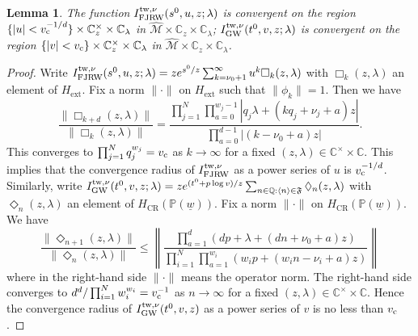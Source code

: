 \documentclass[11pt]{amsart}
\newtheorem{lem}[thm]{Lemma} %
\theoremstyle{definition} %
\theoremstyle{remark} %
\newcommand{\CC}{\mathbb C}
\newcommand{\PP}{\mathbb P}
\newcommand{\QQ}{\mathbb Q}
\newcommand{\tw}{{\rm tw}}
\def\GW{\operatorname{\text{GW}}}
\def\CR{\operatorname{\text{CR}}}
\def\fracp#1{\left\langle #1 \right\rangle}
\newcommand{\cM}{\mathcal{M}}
\newcommand{\hcM}{\widehat{\cM}}
\newcommand{\frF}{\mathfrak{F}}
\newcommand{\ext}{{\operatorname{ext}}}
\newcommand{\FJRW}{{\operatorname{FJRW}}}
\renewcommand{\GW}{{\operatorname{GW}}}
\renewcommand{\CR}{{\operatorname{CR}}}
\newcommand{\vc}{v_{\rm c}}
\newcommand{\uw}{\underline{w}}
\begin{document}
\begin{lem} 
\label{lem:convergence}
The function $I^{\tw,\nu}_{\FJRW}(s^0,u,z;\lambda)$ is convergent 
on the region $\{|u| < \vc^{-1/d}\} \times
\CC_z^\times \times  \CC_\lambda$ in $\hcM \times \CC_z \times 
\CC_\lambda$; $I^{\tw,\nu}_{\GW}(t^0,v,z;\lambda)$ 
is convergent 
on the region 
$\{|v| < \vc\} \times \CC_z^\times \times \CC_\lambda$ in 
$\hcM \times \CC_z \times \CC_\lambda$. 
\end{lem} 
\begin{proof} 
Write $I^{\tw, \nu}_{\FJRW}(s^0,u,z;\lambda) = z e^{s^0/z} 
\sum_{k=\nu_0+1}^{\infty} u^k \Box_k(z,\lambda)$ with 
$\Box_k(z,\lambda)$ an element of $H_{\ext}$. 
Fix a norm $\|\cdot\|$ on $H_{\ext}$ such that $\|\phi_{k}\|=1$. 
Then we have 
\[
\frac{\|\Box_{k+d}(z,\lambda)\|}{\|\Box_k(z,\lambda)\|} 
= \frac{\prod_{j=1}^N \prod_{a=0}^{w_j-1} 
|q_j \lambda + (kq_j + \nu_j +a)z|}
{\prod_{a=0}^{d-1}|(k-\nu_0 +a)z|}.  
\]
This converges to $\prod_{j=1}^N q_j^{w_j} = \vc$ 
as $k\to \infty$ 
for a fixed $(z,\lambda)\in \CC^\times \times \CC$. 
This implies that the convergence radius of $I^{\tw,\nu}_{\FJRW}$ 
as a power series of $u$ is $\vc^{-1/d}$.  
Similarly, write $I^{\tw,\nu}_{\GW}(t^0,v,z;\lambda) = 
z e^{(t^0+ p \log v)/z} \sum_{n\in \QQ : \fracp{n} \in \frF}
\Diamond_n(z,\lambda)$ with $\Diamond_n(z,\lambda)$ 
an element of $H_{\CR}(\PP(\uw))$.  
Fix a norm $\| \cdot \|$ on $H_{\CR}(\PP(\uw))$. 
We have 
\[
\frac{\|\Diamond_{n+1}(z,\lambda)\|}{\|\Diamond_n(z,\lambda)\|}
\le \left \| 
\frac{
\prod_{a=1}^d (dp + \lambda + (d n + \nu_0+a) z) }
{
\prod_{i=1}^N 
\prod_{a=1}^{w_i} ( w_i p + (w_i n - \nu_i + a)z)
} 
\right \| 
\]
where in the right-hand side $\|\cdot\|$ means the operator norm. 
The right-hand side converges to $d^d/\prod_{i=1}^N w_i^{w_i} = \vc^{-1}$ 
as $n\to \infty$ for a fixed $(z,\lambda) \in \CC^\times \times \CC$. 
Hence the convergence radius of 
$I^{\tw,\nu}_{\GW}(t^0,v,z)$ as a power series of 
$v$ is no less than $\vc$. 
\end{proof} 
\end{document}

